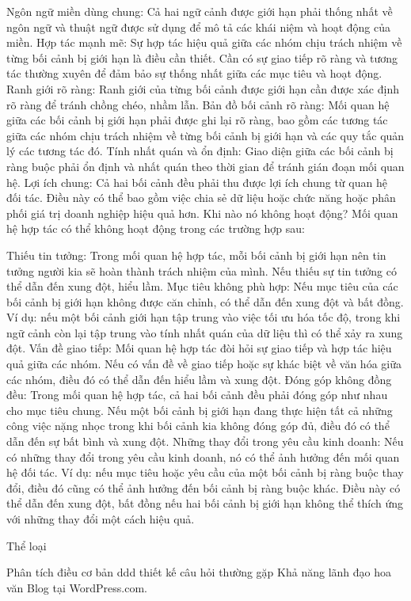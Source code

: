 Ngôn ngữ miền dùng chung: Cả hai ngữ cảnh được giới hạn phải thống nhất về ngôn ngữ và thuật ngữ được sử dụng để mô tả các khái niệm và hoạt động của miền.
Hợp tác mạnh mẽ: Sự hợp tác hiệu quả giữa các nhóm chịu trách nhiệm về từng bối cảnh bị giới hạn là điều cần thiết. Cần có sự giao tiếp rõ ràng và tương tác thường xuyên để đảm bảo sự thống nhất giữa các mục tiêu và hoạt động.
Ranh giới rõ ràng: Ranh giới của từng bối cảnh được giới hạn cần được xác định rõ ràng để tránh chồng chéo, nhầm lẫn.
Bản đồ bối cảnh rõ ràng: Mối quan hệ giữa các bối cảnh bị giới hạn phải được ghi lại rõ ràng, bao gồm các tương tác giữa các nhóm chịu trách nhiệm về từng bối cảnh bị giới hạn và các quy tắc quản lý các tương tác đó.
Tính nhất quán và ổn định: Giao diện giữa các bối cảnh bị ràng buộc phải ổn định và nhất quán theo thời gian để tránh gián đoạn mối quan hệ.
Lợi ích chung: Cả hai bối cảnh đều phải thu được lợi ích chung từ quan hệ đối tác. Điều này có thể bao gồm việc chia sẻ dữ liệu hoặc chức năng hoặc phân phối giá trị doanh nghiệp hiệu quả hơn.
Khi nào nó không hoạt động?
Mối quan hệ hợp tác có thể không hoạt động trong các trường hợp sau:

Thiếu tin tưởng: Trong mối quan hệ hợp tác, mỗi bối cảnh bị giới hạn nên tin tưởng người kia sẽ hoàn thành trách nhiệm của mình. Nếu thiếu sự tin tưởng có thể dẫn đến xung đột, hiểu lầm.
Mục tiêu không phù hợp: Nếu mục tiêu của các bối cảnh bị giới hạn không được căn chỉnh, có thể dẫn đến xung đột và bất đồng. Ví dụ: nếu một bối cảnh giới hạn tập trung vào việc tối ưu hóa tốc độ, trong khi ngữ cảnh còn lại tập trung vào tính nhất quán của dữ liệu thì có thể xảy ra xung đột.
Vấn đề giao tiếp: Mối quan hệ hợp tác đòi hỏi sự giao tiếp và hợp tác hiệu quả giữa các nhóm. Nếu có vấn đề về giao tiếp hoặc sự khác biệt về văn hóa giữa các nhóm, điều đó có thể dẫn đến hiểu lầm và xung đột.
Đóng góp không đồng đều: Trong mối quan hệ hợp tác, cả hai bối cảnh đều phải đóng góp như nhau cho mục tiêu chung. Nếu một bối cảnh bị giới hạn đang thực hiện tất cả những công việc nặng nhọc trong khi bối cảnh kia không đóng góp đủ, điều đó có thể dẫn đến sự bất bình và xung đột.
Những thay đổi trong yêu cầu kinh doanh: Nếu có những thay đổi trong yêu cầu kinh doanh, nó có thể ảnh hưởng đến mối quan hệ đối tác. Ví dụ: nếu mục tiêu hoặc yêu cầu của một bối cảnh bị ràng buộc thay đổi, điều đó cũng có thể ảnh hưởng đến bối cảnh bị ràng buộc khác. Điều này có thể dẫn đến xung đột, bất đồng nếu hai bối cảnh bị giới hạn không thể thích ứng với những thay đổi một cách hiệu quả.

Thể loại

Phân tích
điều cơ bản
ddd
thiết kế
câu hỏi thường gặp
Khả năng lãnh đạo
hoa văn
Blog tại WordPress.com.
